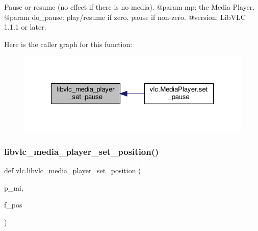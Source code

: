 \begin{DoxyVerb}Pause or resume (no effect if there is no media).
@param mp: the Media Player.
@param do_pause: play/resume if zero, pause if non-zero.
@version: LibVLC 1.1.1 or later.
\end{DoxyVerb}
 Here is the caller graph for this function\+:
\nopagebreak
\begin{figure}[H]
\begin{center}
\leavevmode
\includegraphics[width=321pt]{namespacevlc_a4e7da817fafe9c1c27e7b6724bb744b8_icgraph}
\end{center}
\end{figure}
\mbox{\label{namespacevlc_a2e1683c42a5d9814960546bf84bf2a6a}} 
\subsubsection{\texorpdfstring{libvlc\+\_\+media\+\_\+player\+\_\+set\+\_\+position()}{libvlc\_media\_player\_set\_position()}}
{\footnotesize\ttfamily def vlc.\+libvlc\+\_\+media\+\_\+player\+\_\+set\+\_\+position (\begin{DoxyParamCaption}\item[{}]{p\+\_\+mi,  }\item[{}]{f\+\_\+pos }\end{DoxyParamCaption})}

